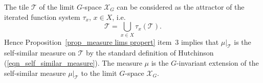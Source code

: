 \documentclass[12pt]{article}
\newcommand{\limGs}[1][G]{\mathcal{X}_{#1}}
\newcommand{\muG}{\mu}
\newcommand{\tile}{\mathscr{T}}
\newtheorem{prop}[theor]{Proposition}
\theoremstyle{definition}
\begin{document}
%
%
%

The tile $\tile$ of the limit $G$-space $\limGs$ can be considered as the attractor of the iterated
function system $\tau_x$, $x\in X$, i.e.
\[
\tile=\bigcup_{x\in X}\tau_x(\tile).
\]
Hence Proposition~\ref{prop_measure lims propert} item~3 implies that $\mu|_{\tile}$ is the
self-similar measure on $\tile$ by the standard definition of Hutchinson
(\ref{eqn_self_similar_measure}). The measure $\mu$ is the $G$-invariant extension of the
self-similar measure $\mu|_{\tile}$ to the limit $G$-space $\limGs$.


\end{document}

